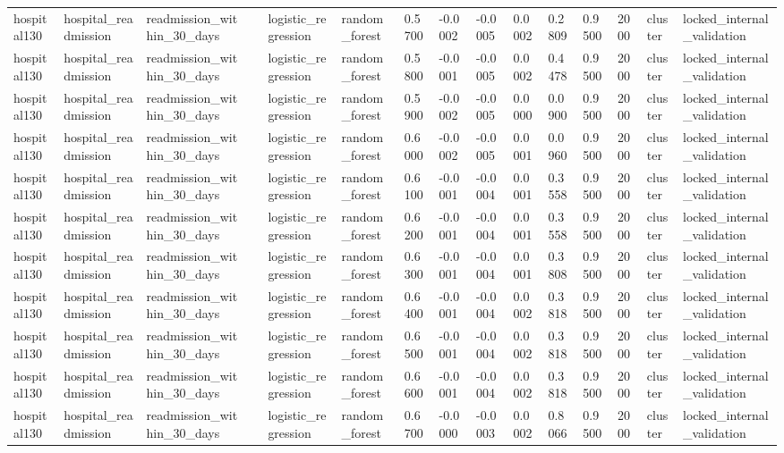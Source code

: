 \begin{tabular}{lllllllllllllll}
hospital130 & hospital\_readmission & readmission\_within\_30\_days &  & logistic\_regression & random\_forest & 0.5700 & -0.0002 & -0.0005 & 0.0002 & 0.2809 & 0.9500 & 2000 & cluster & locked\_internal\_validation \\
hospital130 & hospital\_readmission & readmission\_within\_30\_days &  & logistic\_regression & random\_forest & 0.5800 & -0.0001 & -0.0005 & 0.0002 & 0.4478 & 0.9500 & 2000 & cluster & locked\_internal\_validation \\
hospital130 & hospital\_readmission & readmission\_within\_30\_days &  & logistic\_regression & random\_forest & 0.5900 & -0.0002 & -0.0005 & 0.0000 & 0.0900 & 0.9500 & 2000 & cluster & locked\_internal\_validation \\
hospital130 & hospital\_readmission & readmission\_within\_30\_days &  & logistic\_regression & random\_forest & 0.6000 & -0.0002 & -0.0005 & 0.0001 & 0.0960 & 0.9500 & 2000 & cluster & locked\_internal\_validation \\
hospital130 & hospital\_readmission & readmission\_within\_30\_days &  & logistic\_regression & random\_forest & 0.6100 & -0.0001 & -0.0004 & 0.0001 & 0.3558 & 0.9500 & 2000 & cluster & locked\_internal\_validation \\
hospital130 & hospital\_readmission & readmission\_within\_30\_days &  & logistic\_regression & random\_forest & 0.6200 & -0.0001 & -0.0004 & 0.0001 & 0.3558 & 0.9500 & 2000 & cluster & locked\_internal\_validation \\
hospital130 & hospital\_readmission & readmission\_within\_30\_days &  & logistic\_regression & random\_forest & 0.6300 & -0.0001 & -0.0004 & 0.0001 & 0.3808 & 0.9500 & 2000 & cluster & locked\_internal\_validation \\
hospital130 & hospital\_readmission & readmission\_within\_30\_days &  & logistic\_regression & random\_forest & 0.6400 & -0.0001 & -0.0004 & 0.0002 & 0.3818 & 0.9500 & 2000 & cluster & locked\_internal\_validation \\
hospital130 & hospital\_readmission & readmission\_within\_30\_days &  & logistic\_regression & random\_forest & 0.6500 & -0.0001 & -0.0004 & 0.0002 & 0.3818 & 0.9500 & 2000 & cluster & locked\_internal\_validation \\
hospital130 & hospital\_readmission & readmission\_within\_30\_days &  & logistic\_regression & random\_forest & 0.6600 & -0.0001 & -0.0004 & 0.0002 & 0.3818 & 0.9500 & 2000 & cluster & locked\_internal\_validation \\
hospital130 & hospital\_readmission & readmission\_within\_30\_days &  & logistic\_regression & random\_forest & 0.6700 & -0.0000 & -0.0003 & 0.0002 & 0.8066 & 0.9500 & 2000 & cluster & locked\_internal\_validation \\

\end{tabular}
